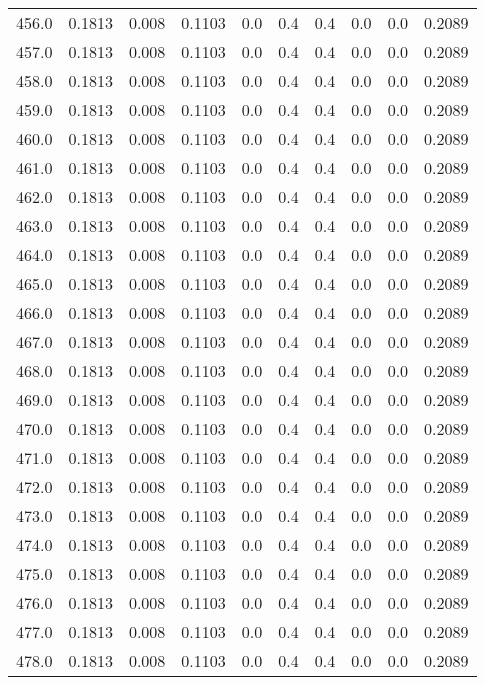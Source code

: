 \begin{longtable}{lrrrrrrrrr}
456.0 & 0.1813 & 0.008 & 0.1103 & 0.0 & 0.4 & 0.4 & 0.0 & 0.0 & 0.2089 \\
457.0 & 0.1813 & 0.008 & 0.1103 & 0.0 & 0.4 & 0.4 & 0.0 & 0.0 & 0.2089 \\
458.0 & 0.1813 & 0.008 & 0.1103 & 0.0 & 0.4 & 0.4 & 0.0 & 0.0 & 0.2089 \\
459.0 & 0.1813 & 0.008 & 0.1103 & 0.0 & 0.4 & 0.4 & 0.0 & 0.0 & 0.2089 \\
460.0 & 0.1813 & 0.008 & 0.1103 & 0.0 & 0.4 & 0.4 & 0.0 & 0.0 & 0.2089 \\
461.0 & 0.1813 & 0.008 & 0.1103 & 0.0 & 0.4 & 0.4 & 0.0 & 0.0 & 0.2089 \\
462.0 & 0.1813 & 0.008 & 0.1103 & 0.0 & 0.4 & 0.4 & 0.0 & 0.0 & 0.2089 \\
463.0 & 0.1813 & 0.008 & 0.1103 & 0.0 & 0.4 & 0.4 & 0.0 & 0.0 & 0.2089 \\
464.0 & 0.1813 & 0.008 & 0.1103 & 0.0 & 0.4 & 0.4 & 0.0 & 0.0 & 0.2089 \\
465.0 & 0.1813 & 0.008 & 0.1103 & 0.0 & 0.4 & 0.4 & 0.0 & 0.0 & 0.2089 \\
466.0 & 0.1813 & 0.008 & 0.1103 & 0.0 & 0.4 & 0.4 & 0.0 & 0.0 & 0.2089 \\
467.0 & 0.1813 & 0.008 & 0.1103 & 0.0 & 0.4 & 0.4 & 0.0 & 0.0 & 0.2089 \\
468.0 & 0.1813 & 0.008 & 0.1103 & 0.0 & 0.4 & 0.4 & 0.0 & 0.0 & 0.2089 \\
469.0 & 0.1813 & 0.008 & 0.1103 & 0.0 & 0.4 & 0.4 & 0.0 & 0.0 & 0.2089 \\
470.0 & 0.1813 & 0.008 & 0.1103 & 0.0 & 0.4 & 0.4 & 0.0 & 0.0 & 0.2089 \\
471.0 & 0.1813 & 0.008 & 0.1103 & 0.0 & 0.4 & 0.4 & 0.0 & 0.0 & 0.2089 \\
472.0 & 0.1813 & 0.008 & 0.1103 & 0.0 & 0.4 & 0.4 & 0.0 & 0.0 & 0.2089 \\
473.0 & 0.1813 & 0.008 & 0.1103 & 0.0 & 0.4 & 0.4 & 0.0 & 0.0 & 0.2089 \\
474.0 & 0.1813 & 0.008 & 0.1103 & 0.0 & 0.4 & 0.4 & 0.0 & 0.0 & 0.2089 \\
475.0 & 0.1813 & 0.008 & 0.1103 & 0.0 & 0.4 & 0.4 & 0.0 & 0.0 & 0.2089 \\
476.0 & 0.1813 & 0.008 & 0.1103 & 0.0 & 0.4 & 0.4 & 0.0 & 0.0 & 0.2089 \\
477.0 & 0.1813 & 0.008 & 0.1103 & 0.0 & 0.4 & 0.4 & 0.0 & 0.0 & 0.2089 \\
478.0 & 0.1813 & 0.008 & 0.1103 & 0.0 & 0.4 & 0.4 & 0.0 & 0.0 & 0.2089 \\

\end{longtable}
